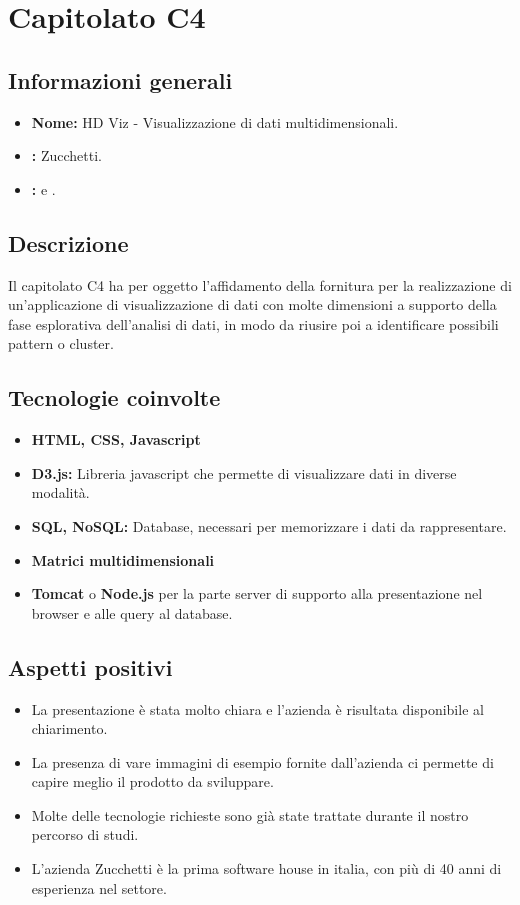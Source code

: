 \section{Capitolato C4}

\subsection{Informazioni generali}
\begin{itemize}
\item \textbf{Nome:} HD Viz - Visualizzazione di dati multidimensionali.
\item \textbf{\commitProg:} Zucchetti.
\item \textbf{\proponProg:} \VT{} e \CR.
\end{itemize}

\subsection{Descrizione}
Il capitolato C4 ha per oggetto l’affidamento della fornitura per la realizzazione di un'applicazione di visualizzazione di dati con molte dimensioni a supporto della fase esplorativa dell'analisi di dati, in modo da riusire poi a identificare possibili pattern o cluster.

\subsection{Tecnologie coinvolte}
\begin{itemize}
\item \textbf{HTML, CSS, Javascript} 
\item \textbf{D3.js:} Libreria javascript che permette di visualizzare dati in diverse modalità.
\item \textbf{SQL, NoSQL:} Database, necessari per memorizzare i dati da rappresentare.
\item \textbf{Matrici multidimensionali}
\item \textbf{Tomcat} o \textbf{Node.js} per la parte server di supporto alla presentazione nel browser e alle query al database.
\end{itemize}

\subsection{Aspetti positivi}
\begin{itemize}
\item La presentazione è stata molto chiara e l’azienda è risultata disponibile al chiarimento.
\item La presenza di vare immagini di esempio fornite dall'azienda ci permette di capire meglio il prodotto da sviluppare.
\item Molte delle tecnologie richieste sono già state trattate durante il nostro percorso di studi.
\item L’azienda Zucchetti è la prima software house in italia, con più di 40 anni di esperienza nel settore.
\end{itemize}

